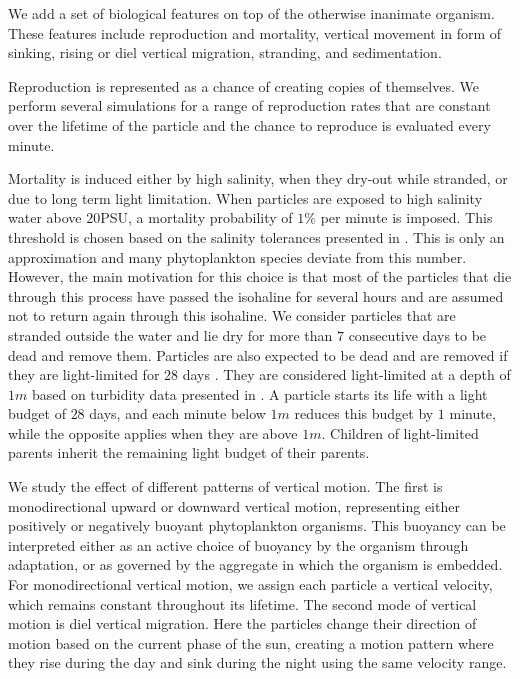 \documentclass[npg, manuscript]{copernicus}
\begin{document}

We add a set of biological features on top of the otherwise inanimate organism.
These features include reproduction and mortality, vertical movement in form of sinking, rising or diel vertical migration, stranding, and sedimentation.

Reproduction is represented as a chance of creating copies of themselves. 
We perform several simulations for a range of reproduction rates that are constant over the lifetime of the particle and the chance to reproduce is evaluated every minute.

Mortality is induced either by high salinity, when they dry-out while stranded, or due to long term light limitation.
When particles are exposed to high salinity water above $20$PSU, a mortality probability of $1\%$ per minute is imposed.
This threshold is chosen based on the salinity tolerances presented in \citep{vonAlvensleben2016}.
This is only an approximation and many phytoplankton species deviate from this number.
However, the main motivation for this choice is that most of the particles that die through this process have passed the isohaline for several hours and are assumed not to return again through this isohaline.
We consider particles that are stranded outside the water and lie dry for more than $7$ consecutive days to be dead and remove them.
Particles are also expected to be dead and are removed if they are light-limited for $28$ days \citep{Walter2017}.
They are considered light-limited at a depth of $1 \unit{m}$ based on turbidity data presented in \citep{Pein2021}.
A particle starts its life with a light budget of $28$ days, and each minute below $1 \unit{m}$ reduces this budget by $1$ minute, while the opposite applies when they are above $1 \unit{m}$.
Children of light-limited parents inherit the remaining light budget of their parents.

\medskip

We study the effect of different patterns of vertical motion.
The first is monodirectional upward or downward vertical motion, representing either positively or negatively buoyant phytoplankton organisms.
This buoyancy can be interpreted either as an active choice of buoyancy by the organism through adaptation, or as governed by the aggregate in which the organism is embedded.
For monodirectional vertical motion, we assign each particle a vertical velocity, which remains constant throughout its lifetime.
The second mode of vertical motion is diel vertical migration.
Here the particles change their direction of motion based on the current phase of the sun, creating a motion pattern where they rise during the day and sink during the night using the same velocity range.
\end{document}
